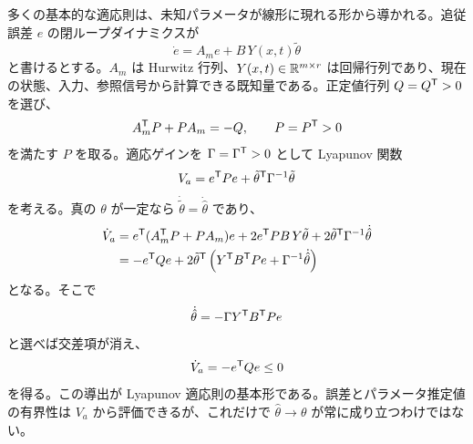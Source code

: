 多くの基本的な適応則は、未知パラメータが線形に現れる形から導かれる。追従誤差 $e$ の閉ループダイナミクスが
\begin{equation}
  \dot{e}=A_m e+B\,Y(x,t)\tilde{\theta}
\end{equation}
と書けるとする。$A_m$ は Hurwitz 行列、$Y(x,t)\in\mathbb{R}^{m\times r}$ は回帰行列であり、現在の状態、入力、参照信号から計算できる既知量である。正定値行列 $Q=Q^{\mathsf{T}}>0$ を選び、
\begin{equation}
  A_m^{\mathsf{T}} P+PA_m=-Q,\qquad P=P^{\mathsf{T}}>0
\end{equation}
を満たす $P$ を取る。適応ゲインを $\Gamma=\Gamma^{\mathsf{T}}>0$ として Lyapunov 関数
\begin{equation}
  V_a=e^{\mathsf{T}} Pe+\tilde{\theta}^{\mathsf{T}} \Gamma^{-1}\tilde{\theta}
\end{equation}
を考える。真の $\theta$ が一定なら $\dot{\tilde{\theta}}=\dot{\hat{\theta}}$ であり、
\begin{align}
  \dot{V}_a
  &=
  e^{\mathsf{T}}(A_m^{\mathsf{T}} P+PA_m)e
  +2e^{\mathsf{T}} PB\,Y\tilde{\theta}
  +2\tilde{\theta}^{\mathsf{T}}\Gamma^{-1}\dot{\hat{\theta}}\\
  &=
  -e^{\mathsf{T}} Qe
  +2\tilde{\theta}^{\mathsf{T}}
    \left(Y^{\mathsf{T}} B^{\mathsf{T}} Pe+\Gamma^{-1}\dot{\hat{\theta}}\right)
\end{align}
となる。そこで
\begin{equation}
  \dot{\hat{\theta}}=-\Gamma Y^{\mathsf{T}} B^{\mathsf{T}} Pe
\end{equation}
と選べば交差項が消え、
\begin{equation}
  \dot{V}_a=-e^{\mathsf{T}} Qe\le0
\end{equation}
を得る。この導出が Lyapunov 適応則の基本形である。誤差とパラメータ推定値の有界性は $V_a$ から評価できるが、これだけで $\hat{\theta}\to\theta$ が常に成り立つわけではない。

